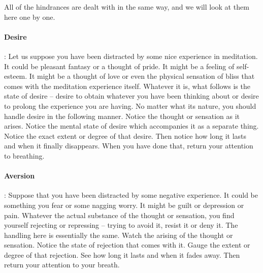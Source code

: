 All of the hindrances are dealt with in the same way, and we will look at them
here one by one.

\paragraph*{Desire}: Let us suppose you have been distracted by some nice experience in meditation. It could be pleasant fantasy or a thought
of pride. It might be a feeling of self-esteem. It might be a thought of love or even the physical sensation of bliss that comes with
the meditation experience itself. Whatever it is, what follows is the state of desire -- desire to obtain whatever you have been
thinking about or desire to prolong the experience you are having. No matter what its nature, you should handle desire in the
following manner. Notice the thought or sensation as it arises. Notice the mental state of desire which accompanies it as a separate
thing. Notice the exact extent or degree of that desire. Then notice how long it lasts and when it finally disappears. When you
have done that, return your attention to breathing.

\paragraph*{Aversion}: Suppose that you have been distracted by some negative experience. It
could be something you fear or some nagging worry. It might be guilt or
depression or pain. Whatever the actual substance of the thought or sensation,
you find yourself rejecting or repressing -- trying to avoid it, resist it or
deny it. The handling here is essentially the same. Watch the arising of the
thought or sensation. Notice the state of rejection that comes with it. Gauge
the extent or degree of that rejection. See how long it lasts and when it fades
away. Then return your attention to your breath.


